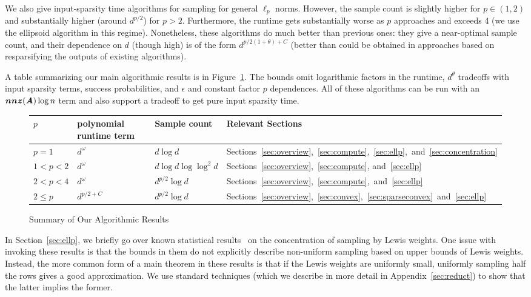 We also give input-sparsity time algorithms for sampling for general $\ell_p$ norms.
However, the sample count is slightly higher for $p \in (1,2)$ and substantially higher
(around $d^{p/2}$) for $p > 2$.  Furthermore, the runtime gets substantially worse as
$p$ approaches and exceeds 4 (we  use the ellipsoid algorithm in this regime).
Nonetheless, these algorithms do much better than previous ones: they give a near-optimal
sample count, and their dependence on $d$ (though high) is of the form
$d^{p/2 (1 + \theta) + C}$
(better than could be obtained in approaches based on resparsifying the
outputs of existing algorithms).

A table summarizing our main algorithmic results is in Figure~\ref{fig:summary}.
The bounds omit logarithmic factors in the runtime, $d^{\theta}$ tradeoffs
with input sparsity terms, success probabilities, and $\epsilon$
and constant factor $p$ dependences.
All of these algorithms can be run with an $\boldsymbol{nnz}(\boldsymbol{\mathit{A}}) \log n$ term and also
support a tradeoff to get pure input sparsity time.


\begin{figure}

\begin{center}

\begin{tabular}{| l | l | l | l | }
\hline
$p$ & polynomial runtime term & Sample count & Relevant Sections\\ \hline
$p = 1$ & $d^{\omega}$ & $d \log d$ &
Sections~\ref{sec:overview},~\ref{sec:compute},~\ref{sec:ellp},~and~\ref{sec:concentration}\\ \hline
$1 < p < 2$ & $d^{\omega}$ & $d \log d \log \log^2 d$ & Sections~\ref{sec:overview},~\ref{sec:compute}, and~\ref{sec:ellp}\\ \hline
$2 < p < 4$ & $d^{\omega}$ & $d^{p/2} \log d$ &
Sections~\ref{sec:overview},~\ref{sec:compute},~and~\ref{sec:ellp}\\ \hline
$2 \leq p $ & $d^{p/2+C}$ & $d^{p/2} \log d$ &
Sections~\ref{sec:overview},~\ref{sec:convex},~\ref{sec:sparseconvex}~and~\ref{sec:ellp}\\ \hline
\end{tabular}

\end{center}

\caption{Summary of Our Algorithmic Results}
\label{fig:summary}
\end{figure}


In Section~\ref{sec:ellp}, we briefly go over known statistical results~\cite{Talagrand90,
TalagrandLp,BourgainLM89} on the concentration of sampling by Lewis weights.
One issue with invoking these results is that the bounds in them do not explicitly
describe non-uniform sampling based on upper bounds of Lewis weights.
Instead, the more common form of a main theorem in these results is that
if the Lewis weights are uniformly small, uniformly sampling half the rows gives
a good approximation.
We use standard techniques (which we describe in more detail in
Appendix~\ref{sec:reduct}) to show that the latter implies the former.

